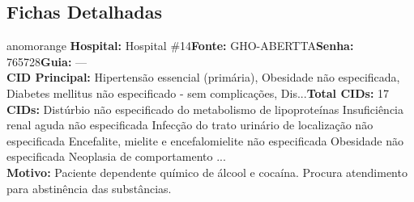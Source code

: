 \documentclass[a4paper,10pt]{article}
\begin{document}
\subsection{Fichas Detalhadas}
\begin{anomalycard}[Interna\c{c}\~{a}o \#7511 | Pac. \#6265 | ALTO (z=4.62) | LOS: 3d | 23/02/2026\,$\to$\,26/02/2026]{anomorange}
\textbf{Hospital:} Hospital \#14\quad \textbf{Fonte:} GHO-ABERTTA\quad \textbf{Senha:} 765728\quad \textbf{Guia:} ---\\

\textbf{CID Principal:} {\small Hipertensão essencial (primária), Obesidade não especificada, Diabetes mellitus não especificado - sem complicações, Dis...}\quad\textbf{Total CIDs:} 17\\

\textbf{CIDs:} {\scriptsize Distúrbio não especificado do metabolismo de lipoproteínas \textbar{} Insuficiência renal aguda não especificada \textbar{} Infecção do trato urinário de localização não especificada \textbar{} Encefalite, mielite e encefalomielite não especificada \textbar{} Obesidade não especificada \textbar{} Neoplasia de comportamento ...}\\

\textbf{Motivo:} {\scriptsize Paciente dependente químico de álcool e cocaína. Procura atendimento para abstinência das substâncias.}\\

\end{anomalycard}
\end{document}
